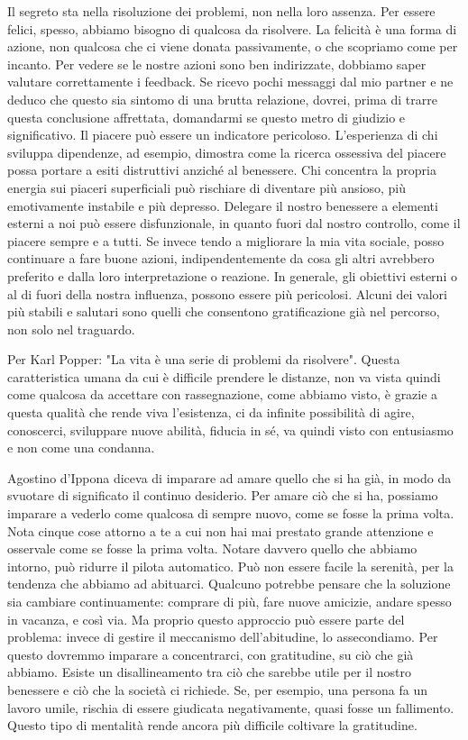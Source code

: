 \documentclass[12pt]{book} %
\begin{document}
Il segreto sta nella risoluzione dei problemi, non nella loro assenza. Per essere felici, spesso, abbiamo bisogno di qualcosa da
risolvere. La felicità è una forma di azione, non qualcosa che ci viene donata passivamente, o che scopriamo come per
incanto. Per vedere se le nostre azioni sono ben indirizzate, dobbiamo saper valutare correttamente i feedback. Se
ricevo pochi messaggi dal mio partner e ne deduco che questo sia sintomo di una brutta relazione, dovrei, prima di
trarre questa conclusione affrettata, domandarmi se questo metro di giudizio e significativo. Il piacere può essere un
indicatore pericoloso. L'esperienza di chi sviluppa dipendenze, ad esempio, dimostra come la ricerca ossessiva del piacere possa portare a esiti distruttivi anziché al benessere. Chi concentra la propria energia sui piaceri superficiali può rischiare di diventare più ansioso, più emotivamente instabile e più depresso. Delegare il nostro benessere a elementi esterni a noi può essere disfunzionale, in quanto fuori dal nostro controllo, come il piacere sempre e a tutti. Se invece tendo a migliorare la mia vita sociale, posso continuare a fare buone azioni,
indipendentemente da cosa gli altri avrebbero preferito e dalla loro interpretazione o reazione. In generale, gli
obiettivi esterni o al di fuori della nostra influenza, possono essere più pericolosi. Alcuni dei valori più stabili e salutari sono quelli che consentono gratificazione già nel percorso, non solo nel traguardo.

Per Karl Popper: "La vita è una serie di problemi da risolvere". Questa
caratteristica umana da cui è difficile prendere le distanze, non va vista quindi come qualcosa da accettare con rassegnazione,
come abbiamo visto, è grazie a questa qualità che rende viva l'esistenza, ci da infinite
possibilità di agire, conoscerci, sviluppare nuove abilità, fiducia in sé, va quindi visto con entusiasmo e non come
una condanna.

Agostino d'Ippona diceva di imparare ad amare quello che si ha già, in modo da svuotare di significato il continuo
desiderio. Per amare ciò che si ha, possiamo imparare a vederlo come qualcosa di sempre nuovo, come se fosse la prima volta. Nota cinque cose attorno a te a cui non hai mai prestato grande attenzione e osservale come se fosse la prima
volta. Notare davvero quello che abbiamo intorno, può ridurre il pilota automatico.
Può non essere facile la serenità, per la tendenza che abbiamo ad abituarci. Qualcuno potrebbe pensare che la soluzione sia cambiare continuamente: comprare di più, fare nuove amicizie, andare spesso in vacanza, e così via. Ma proprio questo approccio può essere parte del problema: invece di gestire il meccanismo dell'abitudine, lo assecondiamo. Per questo dovremmo imparare a concentrarci, con gratitudine, su ciò che già abbiamo.
Esiste un disallineamento tra ciò che sarebbe utile per il nostro benessere e ciò che la società ci richiede. Se, per esempio, una persona fa un lavoro umile, rischia di essere giudicata negativamente, quasi fosse un fallimento. Questo tipo di mentalità rende ancora più difficile coltivare la gratitudine.
\end{document}

